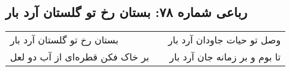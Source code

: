 \begin{center}
\section*{رباعی شماره ۷۸: بستان رخ تو گلستان آرد بار}
\label{sec:078}
\begin{longtable}{l p{0.5cm} r}
بستان رخ تو گلستان آرد بار
&&
وصل تو حیات جاودان آرد بار
\\
بر خاک فکن قطره‌ای از آب دو لعل
&&
تا بوم و بر زمانه جان آرد بار
\\
\end{longtable}
\end{center}
